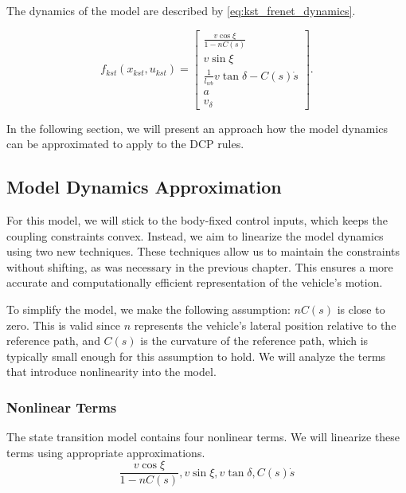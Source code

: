 The dynamics of the model are described by \eqref{eq:kst_frenet_dynamics}.

\begin{equation}
	f_{kst}(x_{kst}, u_{kst}) =
	\begin{bmatrix}
		\frac{v \cos\xi}{1 - nC(s)}                \\[8pt]
		v \sin\xi                                  \\[8pt]
		\frac{1}{l_{wb}}v \tan\delta - C(s)\dot{s} \\[8pt]
		a                                          \\[8pt]
		v_\delta
	\end{bmatrix}.
	\label{eq:kst_frenet_dynamics}
\end{equation}

In the following section, we will present an approach how the model dynamics can be approximated to apply to the DCP rules.

\subsection{Model Dynamics Approximation} \label{subsec:approximation_of_model_dynamics}

For this model, we will stick to the body-fixed control inputs, which keeps the coupling constraints convex.
Instead, we aim to linearize the model dynamics using two new techniques.
These techniques allow us to maintain the constraints without shifting, as was necessary in the previous chapter.
This ensures a more accurate and computationally efficient representation of the vehicle's motion.

To simplify the model, we make the following assumption: $nC(s)$ is close to zero.
This is valid since $n$ represents the vehicle's lateral position relative to the reference path, and $C(s)$ is the curvature of the reference path,
which is typically small enough for this assumption to hold.
We will analyze the terms that introduce nonlinearity into the model.

\subsubsection{Nonlinear Terms}

The state transition model contains four nonlinear terms.
We will linearize these terms using appropriate approximations.
\[
	\frac{v \cos\xi}{1 - nC(s)} ,
	v \sin\xi                   ,
	v \tan\delta                ,
	C(s)\dot{s}
\]

